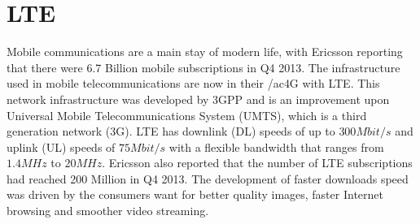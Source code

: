 \chapter{LTE}\label{lte}
Mobile communications are a main stay of modern life, with Ericsson reporting that there were 6.7 Billion mobile subscriptions in Q4 2013. The infrastructure used in mobile telecommunications are now in their /ac{4G} with LTE. This network infrastructure was developed by 3GPP and is an improvement upon Universal Mobile Telecommunications System (UMTS), which is a third generation network (3G). LTE has downlink (DL) speeds of up to $300 Mbit/s$ and uplink (UL) speeds of $75 Mbit/s$ with a flexible bandwidth that ranges from $1.4 MHz$ to $20 MHz$. Ericsson also reported that the number of LTE subscriptions had reached 200 Million in Q4 2013. The development of faster downloads speed was driven by the consumers want for better quality images, faster Internet browsing and smoother video streaming.~\cite{ericsson2014, cox2012introduction}
